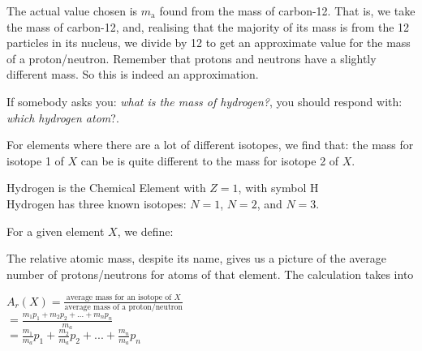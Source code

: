 The actual value chosen is $m_{\text{a}}$ found from the mass of carbon-12. That is, 
we take the mass of carbon-12, and, realising that the majority of its mass is from 
the 12 particles in its nucleus, we divide by 12 to get an approximate value for 
the mass of a proton/neutron. Remember that protons and neutrons have a slightly 
different mass. So this is indeed an approximation.



\frmrule

If somebody asks you: \textit{what is the mass of hydrogen?}, 
you should respond with: \textit{which hydrogen atom}?. 


For elements where there are a lot of different isotopes, we find that:
the mass for isotope 1 of $X$ can be is quite different to the mass for isotope 2 of $X$.


\frmrule

\begin{example}
Hydrogen is the Chemical Element with $Z = 1$, with symbol H \\
Hydrogen has three known isotopes: $N = 1$, $N = 2$, and $N = 3$. \\
\end{example}

For a given element $X$, we define:

The relative atomic mass, despite its name, gives us a picture of the average number of 
protons/neutrons for atoms of that element. The calculation takes 
into



$A_r(X) = \frac{\text{average mass for an isotope of } X}{\text{average mass of a proton/neutron}}$ \\
$= \frac{m_1 p_1 + m_2 p_2 + ... + m_n p_n }{m_a}$ \\
$= \frac{m_1}{m_a}p_1 + \frac{m_2}{m_a}p_2 +  ... + \frac{m_n}{m_a}p_n$ \\

\frmrule

